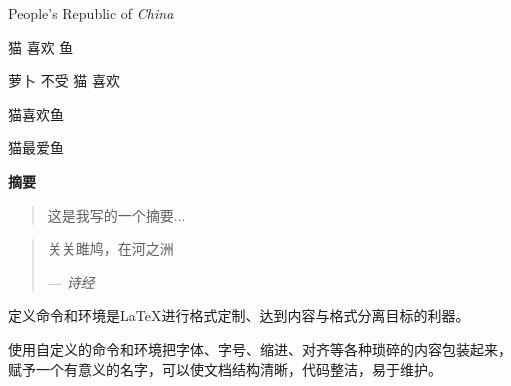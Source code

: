 \documentclass{ctexart}
\newcommand\PRC {People's Republic of \emph{China}}
\newcommand\loves[2]{#1 喜欢 #2}
\newcommand\hateby[2]{#2 不受 #1 喜欢}
\newcommand\like[3][喜欢]{#2#1#3}
\newenvironment{myabstract}[1][摘要]
{\huge
 \begin{center}\bfseries #1 \end{center}
 \normalsize \begin{quotation}
}
{\end{quotation}}
\newenvironment{Quot}[1]
{
 \newcommand\quotesource{#1}
 \begin{quotation}
}
{
 \par\hfill --- \textit{\quotesource}
 \end{quotation}
}
\begin{document}
    \PRC

    \loves{猫}{鱼}

    \hateby{猫}{萝卜}

    \like{猫}{鱼}

    \like[最爱]{猫}{鱼}

    \begin{abstract}
    \end{abstract}

    \begin{myabstract}
    这是我写的一个摘要...
    \end{myabstract}

    \begin{Quot}{诗经}
    关关雎鸠，在河之洲
    \end{Quot}

    定义命令和环境是\LaTeX 进行格式定制、达到内容与格式分离目标的利器。

    使用自定义的命令和环境把字体、字号、缩进、对齐等各种琐碎的内容包装起来，赋予一个有意义的名字，可以使文档结构清晰，代码整洁，易于维护。
\end{document}
